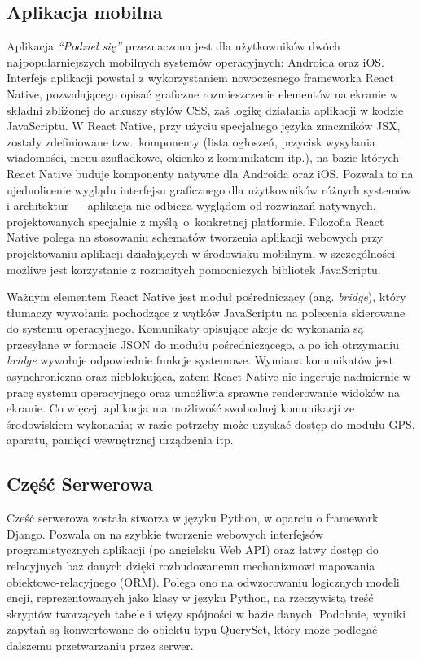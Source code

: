 \documentclass[licencjacka]{pracamgr}
\begin{document}
\subsection{Aplikacja mobilna}
Aplikacja \textit{``Podziel się''} przeznaczona jest dla użytkowników dwóch najpopularniejszych mobilnych systemów operacyjnych: Androida oraz iOS\@. Interfejs aplikacji powstał z wykorzystaniem nowoczesnego frameworka React Native, pozwalającego opisać graficzne rozmieszczenie elementów na ekranie w składni zbliżonej do arkuszy stylów CSS, zaś logikę działania aplikacji w kodzie JavaScriptu. W React Native, przy użyciu specjalnego języka znaczników JSX, zostały zdefiniowane tzw.\ komponenty (lista ogłoszeń, przycisk wysyłania wiadomości, menu szufladkowe, okienko z komunikatem itp.), na bazie których React Native buduje komponenty natywne dla Androida oraz iOS\@. Pozwala to na ujednolicenie wyglądu interfejsu graficznego dla użytkowników różnych systemów i architektur --- aplikacja nie odbiega wyglądem od rozwiązań natywnych, projektowanych specjalnie z myślą~o~konkretnej platformie. Filozofia React Native polega na stosowaniu schematów tworzenia aplikacji webowych przy projektowaniu aplikacji działających w środowisku mobilnym, w szczególności możliwe jest korzystanie z rozmaitych pomocniczych bibliotek JavaScriptu.


Ważnym elementem React Native jest moduł pośredniczący (ang. \textit{bridge}), który tłumaczy wywołania pochodzące z wątków JavaScriptu na polecenia skierowane do systemu operacyjnego. Komunikaty opisujące akcje do wykonania są przesyłane w formacie JSON do modułu pośredniczącego, a po ich otrzymaniu \textit{bridge} wywołuje odpowiednie funkcje systemowe. Wymiana komunikatów jest asynchroniczna oraz nieblokująca, zatem React Native nie ingeruje nadmiernie w pracę systemu operacyjnego oraz umożliwia sprawne renderowanie widoków na ekranie. Co więcej, aplikacja ma możliwość swobodnej komunikacji ze środowiskiem wykonania; w razie potrzeby może uzyskać dostęp do modułu GPS, aparatu, pamięci wewnętrznej urządzenia itp.

\subsection{Część Serwerowa} 

Cześć serwerowa została stworza w języku Python, w oparciu o framework Django. Pozwala on na szybkie tworzenie webowych interfejsów programistycznych aplikacji (po angielsku Web API) oraz łatwy dostęp do relacyjnych baz danych dzięki rozbudowanemu mechanizmowi mapowania obiektowo-relacyjnego (ORM). Polega ono na odwzorowaniu logicznych modeli encji, reprezentowanych jako klasy w języku Python, na rzeczywistą treść skryptów tworzących tabele i więzy spójności w bazie danych. Podobnie, wyniki zapytań są konwertowane do obiektu typu QuerySet, który może podlegać dalszemu przetwarzaniu przez serwer.
\end{document}
